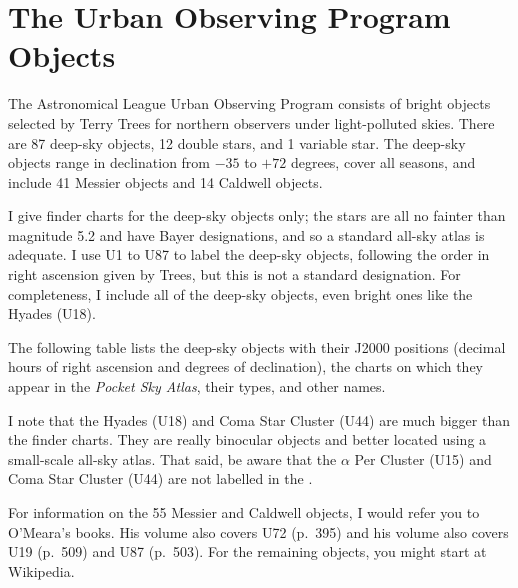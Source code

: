 
\chapter{The Urban Observing Program Objects}

The Astronomical League Urban Observing Program consists of bright objects selected by Terry Trees for northern observers under light-polluted skies. There are 87 deep-sky objects, 12 double stars, and 1 variable star. The deep-sky objects range in declination from $-35$ to $+72$ degrees, cover all seasons, and include 41 Messier objects and 14 Caldwell objects.  

I give finder charts for the deep-sky objects only; the stars are all no fainter than magnitude 5.2 and have Bayer designations, and so a standard all-sky atlas is adequate. I use U1 to U87 to label the deep-sky objects, following the order in right ascension given by Trees, but this is not a standard designation.  For completeness, I include all of the deep-sky objects, even bright ones like the Hyades (U18).

The following table lists the deep-sky objects with their J2000 positions (decimal hours of right ascension and degrees of declination), the charts on which they appear in the \emph{Pocket Sky Atlas}, their types, and other names. 

I note that the Hyades (U18) and Coma Star Cluster (U44) are much bigger than the finder charts. They are really binocular objects and better located using a small-scale all-sky atlas. That said, be aware that the $\alpha$ Per Cluster (U15) and Coma Star Cluster (U44) are not labelled in the {\PSA}. 

For information on the 55 Messier and Caldwell objects, I would refer you to O’Meara’s  books. His  volume also covers U72 (p.\ 395) and his  volume also covers U19 (p.\ 509) and U87 (p.~503). For the remaining objects, you might start at Wikipedia.

\clearpage

